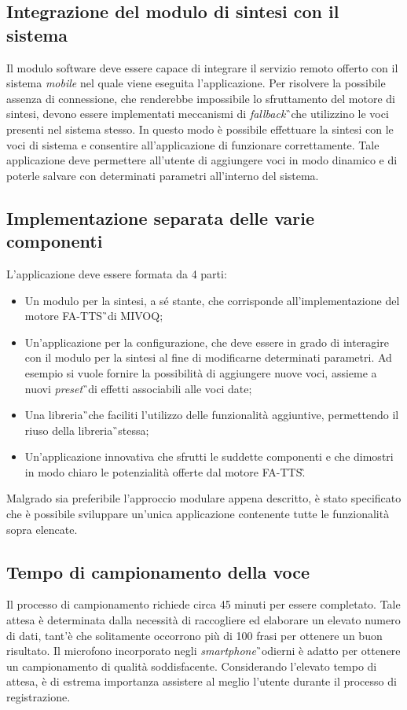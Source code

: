 \subsection{Integrazione del modulo di sintesi con il sistema}
Il modulo software deve essere capace di integrare il servizio remoto offerto con il sistema \textit{mobile} nel quale viene eseguita l'applicazione. Per risolvere la possibile assenza di connessione, che renderebbe impossibile lo sfruttamento del motore di sintesi, devono essere implementati meccanismi di \textit{fallback}\G\ che utilizzino le voci presenti nel sistema stesso. In questo modo è possibile effettuare la sintesi con le voci di sistema e consentire all'applicazione di funzionare correttamente. Tale applicazione deve permettere all'utente di aggiungere voci in modo dinamico e di poterle salvare con determinati parametri all'interno del sistema.

\subsection{Implementazione separata delle varie componenti}
L'applicazione deve essere formata da 4 parti:
\begin{itemize}
	\item Un modulo per la sintesi, a sé stante, che corrisponde all'implementazione del motore FA-TTS\G\ di MIVOQ;
	\item Un'applicazione per la configurazione, che deve essere in grado di interagire con il modulo per la sintesi al fine di modificarne determinati parametri. Ad esempio si vuole fornire la possibilità di aggiungere nuove voci, assieme a nuovi \textit{preset}\G\ di effetti associabili alle voci date;
	\item Una libreria\G\ che faciliti l'utilizzo delle funzionalità aggiuntive, permettendo il riuso della libreria\G\ stessa;
	\item Un'applicazione innovativa che sfrutti le suddette componenti e che dimostri in modo chiaro le potenzialità offerte dal motore FA-TTS\G.
\end{itemize}
Malgrado sia preferibile l'approccio modulare appena descritto, è stato specificato che è possibile sviluppare un'unica applicazione contenente tutte le funzionalità sopra elencate. 

\subsection{Tempo di campionamento della voce}
Il processo di campionamento richiede circa 45 minuti per essere completato. Tale attesa è determinata dalla necessità di raccogliere ed elaborare un elevato numero di dati, tant'è che solitamente occorrono più di 100 frasi per ottenere un buon risultato. Il microfono incorporato negli \textit{smartphone}\G\ odierni è adatto per ottenere un campionamento di qualità soddisfacente. Considerando l'elevato tempo di attesa, è di estrema importanza  assistere al meglio l'utente durante il processo di registrazione.

